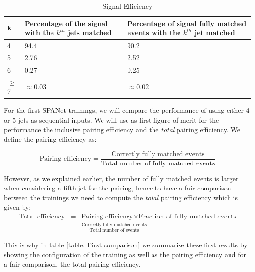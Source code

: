 \begin{table}[h!]
\centering
\begin{tabular}{|p{1cm}||p{6cm}||p{6cm}|}
 \hline
 k  & Percentage of the signal with the $k^{th}$ jets matched & Percentage of signal fully matched events with the $k^{th}$ jet matched\\
 \hline
 4 &  94.4 & 90.2\\
 5 & 2.76 & 2.52 \\
 6 & 0.27 & 0.25 \\
 $\geq$7 &  $\approx$0.03 &  $\approx$0.02 \\
 \hline
\end{tabular}
\caption{Signal Efficiency}
\label{table:signal_efficiency}
\end{table}

For the first SPANet trainings, we will compare the performance of using either 4 or 5 jets as sequential inputs. We will use as first figure of merit for the performance the inclusive pairing efficiency and the \textit{total} pairing efficiency. We define the pairing efficiency as:

\begin{equation*}
    \text{Pairing efficiency}=\frac{\text{Correctly fully matched events}}{\text{Total number of fully matched events}}
\end{equation*}

However, as we explained earlier, the number of fully matched events is larger when considering a fifth jet for the pairing, hence to have a fair comparison between the trainings we need to compute the \textit{total} pairing efficiency which is given by:
\vspace{-0.2cm}
\begin{eqnarray*}
\text{Total efficiency} & = & \text{Pairing efficiency} \times \text{Fraction of fully matched events} \\
& = &\frac{\text{Correctly fully matched events}}{\text{Total number of events}}     
\end{eqnarray*}

This is why in table \ref{table: First comparison} we summarize these first results by showing the configuration of the training as well as the pairing efficiency and for a fair comparison, the total pairing efficiency.

